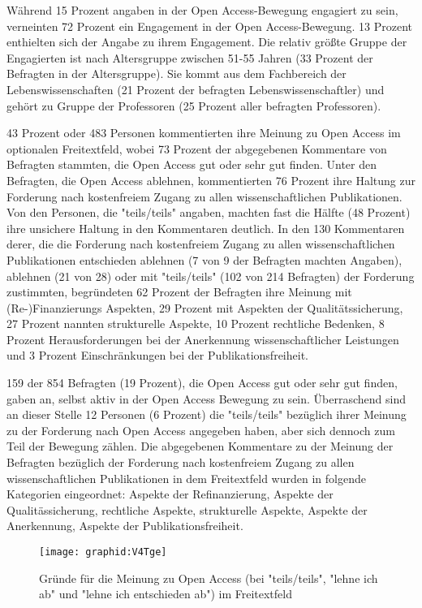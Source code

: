 Während 15 Prozent angaben in der Open Access-Bewegung engagiert zu sein, verneinten 72 Prozent ein Engagement in der Open Access-Bewegung. 13 Prozent enthielten sich der Angabe zu ihrem Engagement. Die relativ größte Gruppe der Engagierten ist nach Altersgruppe zwischen 51-55 Jahren (33 Prozent der Befragten in der Altersgruppe). Sie kommt aus dem Fachbereich der Lebenswissenschaften (21 Prozent der befragten Lebenswissenschaftler) und gehört zu Gruppe der Professoren (25 Prozent aller befragten Professoren).

43 Prozent oder 483 Personen kommentierten ihre Meinung zu Open Access im optionalen Freitextfeld, wobei 73 Prozent der abgegebenen Kommentare von Befragten stammten, die Open Access gut oder sehr gut finden. Unter den Befragten, die Open Access ablehnen, kommentierten 76 Prozent ihre Haltung zur Forderung nach kostenfreiem Zugang zu allen wissenschaftlichen Publikationen. Von den Personen, die "teils/teils" angaben, machten fast die Hälfte (48 Prozent) ihre unsichere Haltung in den Kommentaren deutlich. In den 130 Kommentaren derer, die die Forderung nach kostenfreiem Zugang zu allen wissenschaftlichen Publikationen entschieden ablehnen (7 von 9 der Befragten machten Angaben), ablehnen (21 von 28) oder mit "teils/teils" (102 von 214 Befragten) der Forderung zustimmten, begründeten 62 Prozent der Befragten ihre Meinung mit (Re-)Finanzierungs Aspekten, 29 Prozent mit Aspekten der Qualitätssicherung, 27 Prozent nannten strukturelle Aspekte, 10 Prozent rechtliche Bedenken, 8 Prozent Herausforderungen bei der Anerkennung wissenschaftlicher Leistungen und 3 Prozent Einschränkungen bei der Publikationsfreiheit.

159 der 854 Befragten (19 Prozent), die Open Access gut oder sehr gut finden, gaben an, selbst aktiv in der Open Access Bewegung zu sein. Überraschend sind an dieser Stelle 12 Personen (6 Prozent) die "teils/teils" bezüglich ihrer Meinung zu der Forderung nach Open Access angegeben haben, aber sich dennoch zum Teil der Bewegung zählen. Die abgegebenen Kommentare zu der Meinung der Befragten bezüglich der Forderung nach kostenfreiem Zugang zu allen wissenschaftlichen Publikationen in dem Freitextfeld wurden in folgende Kategorien eingeordnet: Aspekte der Refinanzierung,	Aspekte der Qualitässicherung, rechtliche Aspekte, strukturelle Aspekte, Aspekte der Anerkennung, Aspekte der Publikationsfreiheit.

\begin{figure}[h!]
\texttt{[image: graphid:V4Tge]}
\caption{Gründe für die Meinung zu Open Access (bei "teils/teils", "lehne ich ab" und "lehne ich entschieden ab") im Freitextfeld }
\end{figure}

